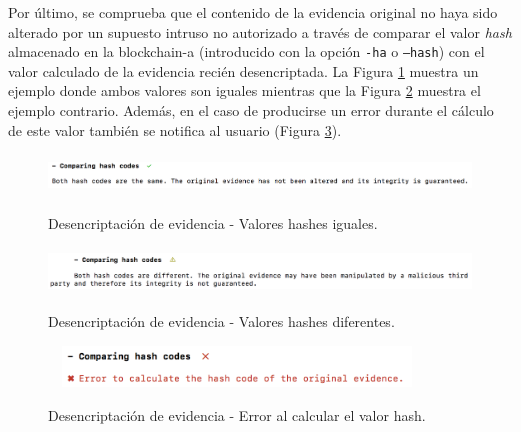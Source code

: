 \documentclass[12pt,a4paper, twoside]{report}
\begin{document}
	Por último, se comprueba que el contenido de la evidencia original no haya sido alterado por un supuesto intruso no autorizado a través de comparar el valor \textit{hash} almacenado en la \gls{blockchain-a} (introducido con la opción \texttt{-ha} o \texttt{--hash}) con el valor calculado de la evidencia recién desencriptada. La Figura \ref{fig:userguide_evidence_hashes} muestra un ejemplo donde ambos valores son iguales mientras que la Figura \ref{fig:userguide_evidence_different_hashes} muestra el ejemplo contrario. Además, en el caso de producirse un error durante el cálculo de este valor también se notifica al usuario (Figura \ref{fig:userguide_evidence_error_hash}). 
	
		\begin{figure}[!ht]   
			\caption{Desencriptación de evidencia - Valores hashes iguales.} 
			\begin{center} 					\includegraphics[width=14cm,height=1.1cm]{Images/userGuide/evidence/hashes} \\
				\label{fig:userguide_evidence_hashes} 
			\end{center}  
		\end{figure}
		
		\begin{figure}[!ht]   
			\caption{Desencriptación de evidencia - Valores hashes diferentes.} 
			\begin{center} 					\includegraphics[width=16cm,height=1.2cm]{Images/userGuide/evidence/different_hashes} \\
				\label{fig:userguide_evidence_different_hashes} 
			\end{center}  
		\end{figure}
		
		\begin{figure}[!ht]   
			\caption{Desencriptación de evidencia - Error al calcular el valor hash.} 
			\begin{center} 					\includegraphics[width=10cm,height=1.1cm]{Images/userGuide/evidence/error_hash} \\
				\label{fig:userguide_evidence_error_hash} 
			\end{center}  
		\end{figure}
	
\end{document}
